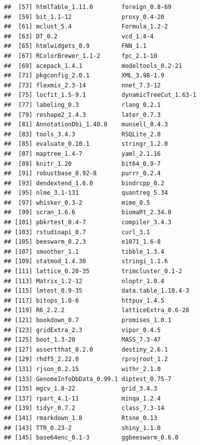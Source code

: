 \documentclass[]{book}
\theoremstyle{definition}
\theoremstyle{definition}
\theoremstyle{definition}
\theoremstyle{remark}
\begin{document}
\begin{verbatim}
##  [57] htmlTable_1.11.0        foreign_0.8-69         
##  [59] bit_1.1-12              proxy_0.4-20           
##  [61] mclust_5.4              Formula_1.2-2          
##  [63] DT_0.2                  vcd_1.4-4              
##  [65] htmlwidgets_0.9         FNN_1.1                
##  [67] RColorBrewer_1.1-2      fpc_2.1-10             
##  [69] acepack_1.4.1           modeltools_0.2-21      
##  [71] pkgconfig_2.0.1         XML_3.98-1.9           
##  [73] flexmix_2.3-14          nnet_7.3-12            
##  [75] locfit_1.5-9.1          dynamicTreeCut_1.63-1  
##  [77] labeling_0.3            rlang_0.2.1            
##  [79] reshape2_1.4.3          later_0.7.3            
##  [81] AnnotationDbi_1.40.0    munsell_0.4.3          
##  [83] tools_3.4.3             RSQLite_2.0            
##  [85] evaluate_0.10.1         stringr_1.2.0          
##  [87] maptree_1.4-7           yaml_2.1.16            
##  [89] knitr_1.20              bit64_0.9-7            
##  [91] robustbase_0.92-8       purrr_0.2.4            
##  [93] dendextend_1.6.0        bindrcpp_0.2           
##  [95] nlme_3.1-131            quantreg_5.34          
##  [97] whisker_0.3-2           mime_0.5               
##  [99] scran_1.6.6             biomaRt_2.34.0         
## [101] pbkrtest_0.4-7          compiler_3.4.3         
## [103] rstudioapi_0.7          curl_3.1               
## [105] beeswarm_0.2.3          e1071_1.6-8            
## [107] smoother_1.1            tibble_1.3.4           
## [109] statmod_1.4.30          stringi_1.1.6          
## [111] lattice_0.20-35         trimcluster_0.1-2      
## [113] Matrix_1.2-12           nloptr_1.0.4           
## [115] lmtest_0.9-35           data.table_1.10.4-3    
## [117] bitops_1.0-6            httpuv_1.4.5           
## [119] R6_2.2.2                latticeExtra_0.6-28    
## [121] bookdown_0.7            promises_1.0.1         
## [123] gridExtra_2.3           vipor_0.4.5            
## [125] boot_1.3-20             MASS_7.3-47            
## [127] assertthat_0.2.0        destiny_2.6.1          
## [129] rhdf5_2.22.0            rprojroot_1.2          
## [131] rjson_0.2.15            withr_2.1.0            
## [133] GenomeInfoDbData_0.99.1 diptest_0.75-7         
## [135] mgcv_1.8-22             grid_3.4.3             
## [137] rpart_4.1-11            minqa_1.2.4            
## [139] tidyr_0.7.2             class_7.3-14           
## [141] rmarkdown_1.8           Rtsne_0.13             
## [143] TTR_0.23-2              shiny_1.1.0            
## [145] base64enc_0.1-3         ggbeeswarm_0.6.0
\end{verbatim}


\end{document}
